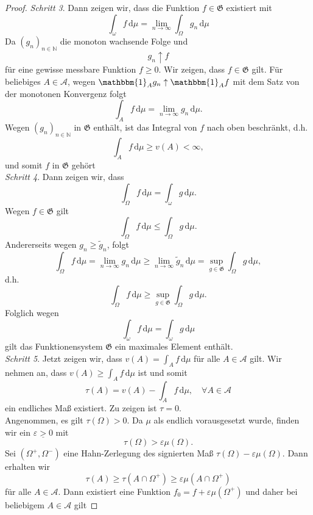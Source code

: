 \documentclass[/Users/zhangwusheng/Documents/satz von radon nikodym/satz von radon nikodym.tex]{subfiles}
\begin{document}
\begin{proof}
        \textit{Schritt 3}. Dann zeigen wir, dass die Funktion $f \in \mathfrak{G}$ existiert mit   
        \[\int_{\omega} f\,\mathrm{d}\mu = \lim_{n \to \infty}\int_{\Omega} g_n\,\mathrm{d}\mu\]
        Da $(g_n)_{n \in \mathbb{N}}$ die monoton wachsende Folge und  
        \[g_n \uparrow f\]
        für eine gewisse messbare Funktion $f \geq 0$. Wir zeigen, dass $f \in \mathfrak{G}$ gilt. Für beliebiges $A \in \mathcal{A}$, wegen $\mathbbm{1}_{A} g_n \uparrow \mathbbm{1}_A f$ mit dem Satz von der
        monotonen Konvergenz folgt 
        \[\int_A f\,\mathrm{d}\mu = \lim_{n \to \infty} g_n\,\mathrm{d}\mu.\]
        Wegen $(g_n)_{n \in \mathbb{N}}$ in $\mathfrak{G}$ enthält, ist das Integral von $f$ nach oben beschränkt, d.h. 
        \[\int_A f\,\mathrm{d}\mu \geq v(A) < \infty,\]
        und somit $f$ in $\mathfrak{G}$ gehört\\
        \textit{Schritt 4}. Dann zeigen wir, dass 
        \[\int_{\Omega} f\,\mathrm{d}\mu = \int_{\omega} g\,\mathrm{d}\mu.\]
        Wegen $f \in \mathfrak{G}$ gilt  
        \[\int_{\Omega} f\,\mathrm{d}\mu \leq \int_{\Omega} g\,\mathrm{d}\mu.\]
        Andererseits wegen $g_n \geq \tilde{g}_n$, folgt 
        \[\int_{\Omega} f\,\mathrm{d}\mu = \lim_{n \to \infty} g_n\,\mathrm{d}\mu \geq \lim_{n \to \infty} \tilde{g}_n\,\mathrm{d}\mu = \sup_{g \in \mathfrak{G}} \int_{\Omega} g\,\mathrm{d}\mu,\]
        d.h. 
        \[\int_{\Omega} f\,\mathrm{d}\mu \geq \sup_{g \in \mathfrak{G}} \int_{\Omega} g\,\mathrm{d}\mu.\]
        Folglich wegen 
        \[\int_{\omega} f\,\mathrm{d}\mu = \int_{\omega} g\,\mathrm{d}\mu\]
        gilt das Funktionensystem $\mathfrak{G}$ ein maximales Element enthält.\\
        \textit{Schritt 5}. Jetzt zeigen wir, dass $v(A) = \int_{A} f\,\mathrm{d}\mu$ für alle $A \in \mathcal{A}$ gilt. Wir nehmen an, dass $v(A) \geq \int_{A} f\,\mathrm{d}\mu$ ist  
        und somit  
        \[\tau(A) = v(A) - \int_A f\,\mathrm{d}\mu, \quad \forall A \in \mathcal{A}\]
        ein endliches Maß existiert. Zu zeigen ist $\tau = 0$.\\ 
        Angenommen, es gilt $\tau(\Omega) > 0$. Da $\mu$ als endlich vorausgesetzt wurde, finden wir ein $\underline{\varepsilon > 0}$ mit
        \[\tau(\Omega) > \varepsilon \mu(\Omega).\]
        Sei $(\Omega^{+}, \Omega^{-})$ eine Hahn-Zerlegung des signierten Maß $\tau(\Omega) - \varepsilon \mu(\Omega)$. Dann erhalten wir 
        \[\tau(A) \geq \tau(A \cap \Omega^{+}) \geq \varepsilon \mu(A \cap \Omega^{+})\]
        für alle $A \in \mathcal{A}$. Dann existiert eine Funktion $f_0 = f + \varepsilon \mu(\Omega^{+})$ und daher bei beliebigem $A \in \mathcal{A}$ gilt 

\end{proof}
\end{document}
